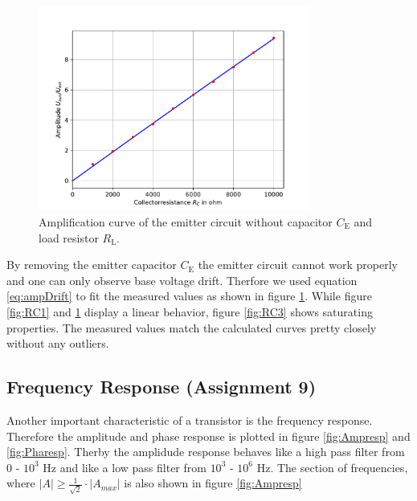 \documentclass[11pt, a4paper]{article}
\begin{document}
\begin{figure}[h]
    \centering
    \includegraphics[width=0.8\textwidth]{plots/RC2.pdf}
    \caption{Amplification curve of the emitter circuit without capacitor $C_{\text{E}}$ and load resistor $R_{\text{L}}.$}
    \label{fig:RC2}
\end{figure}
By removing the emitter capacitor $C_{\text{E}}$ the emitter circuit cannot work properly and one can only observe base voltage drift. Therfore we used equation \ref{eq:ampDrift} to fit the measured values as shown in figure \ref{fig:RC2}.
While figure \ref{fig:RC1} and \ref{fig:RC2} display a linear behavior, figure \ref{fig:RC3} shows saturating properties.
The measured values match the calculated curves pretty closely without any outliers.

\FloatBarrier
\subsection{Frequency Response (Assignment 9)}
Another important characteristic of a transistor is the frequency response. Therefore the amplitude and phase response is plotted in figure \ref{fig:Ampresp} and \ref{fig:Pharesp}.
Therby the amplidude response behaves like a high pass filter from 0 - $10^3$ \si{\hertz} and like a low pass filter from $10^3$ - $10^6$ \si{\hertz}.
The section of frequencies, where $\left\lvert A \right\rvert \geq \frac{1}{\sqrt{2}}  \cdot \left\lvert A_{max} \right\lvert$ is also shown in figure \ref{fig:Ampresp}
\end{document}
